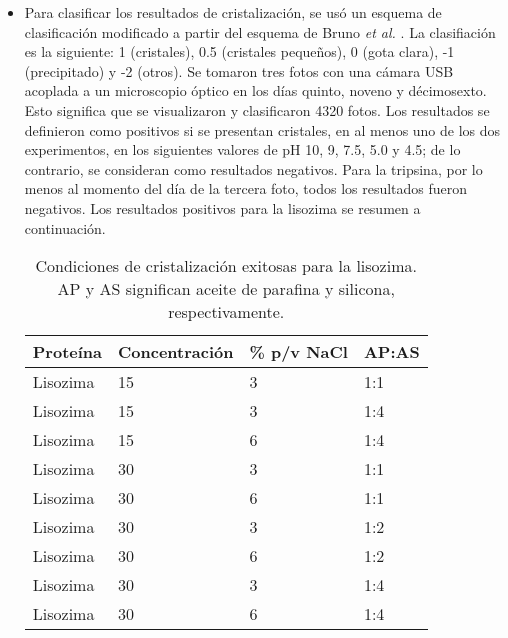 \documentclass[11pt,letterpaper]{article}
\begin{document}
\begin{enumerate}
\begin{itemize}
		\item Para clasificar los resultados de cristalización, se usó un esquema de clasificación modificado a partir del esquema de Bruno \emph{et al.} \cite{Bruno2018}. La clasifiación es la siguiente: 1 (cristales), 0.5 (cristales pequeños), 0 (gota clara), -1 (precipitado) y -2 (otros). Se tomaron tres fotos con una cámara USB acoplada a un microscopio óptico en los días quinto, noveno y décimosexto. Esto significa que se visualizaron y clasificaron \num{4320} fotos. Los resultados se definieron como positivos si se presentan cristales, en al menos uno de los dos experimentos, en los siguientes valores de pH 10, 9, 7.5, 5.0 y 4.5; de lo contrario, se consideran como resultados negativos. Para la tripsina, por lo menos al momento del día de la tercera foto, todos los resultados fueron negativos. Los resultados positivos para la lisozima se resumen a continuación.
		
		
		\begin{table}[h]
			\centering
			\begin{tabular}{@{}llll@{}}
				\toprule
				Proteína & Concentración & \% p/v NaCl & AP:AS \\ \midrule
				Lisozima & 15 & 3 & 1:1 \\
				Lisozima & 15 & 3 & 1:4 \\
				Lisozima & 15 & 6 & 1:4 \\
				Lisozima & 30 & 3 & 1:1 \\
				Lisozima & 30 & 6 & 1:1 \\
				Lisozima & 30 & 3 & 1:2 \\
				Lisozima & 30 & 6 & 1:2 \\
				Lisozima & 30 & 3 & 1:4 \\
				Lisozima & 30 & 6 & 1:4 \\ \bottomrule
			\end{tabular}
			\caption{Condiciones de cristalización exitosas para la lisozima. AP y AS significan aceite de parafina y silicona, respectivamente.}
			\label{tab:my-table}
		\end{table}
	\end{itemize}


\end{enumerate}
\end{document}
